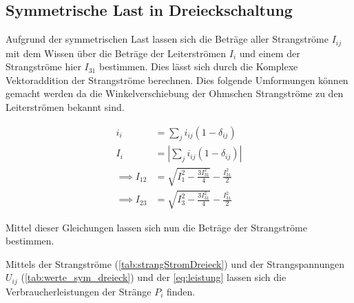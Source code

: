 \documentclass[12pt,english,ngerman]{scrartcl}
\begin{document}
\subsection{Symmetrische Last in Dreieckschaltung}\label{sec:ausw_dreieck}

Aufgrund der symmetrischen Last lassen sich die Beträge aller Strangströme
$I_{ij}$ mit dem Wissen über die Beträge der Leiterströmen $I_i$ und einem der
Strangströme hier $I_{31}$ bestimmen. Dies lässt sich durch die Komplexe
Vektoraddition der Strangströme berechnen. Dies folgende Umformungen können
gemacht werden da die Winkelverschiebung der Ohmschen Strangströme zu den
Leiterströmen bekannt sind.

\begin{align}
	i_{i}           & = \sum_{j} i_{ij} (1-\delta_{ij})                                                    \\
	I_{i}           & = |\sum_{j} i_{ij} (1-\delta_{ij})|                                                  \\
	\implies I_{12} & = \sqrt{I_1^2-\frac{3I_{31}^2}{4}}-\frac{I_{31}^2}{2}                                \\
	\implies I_{23} & = \sqrt{I_3^2-\frac{3I_{31}^2}{4}}-\frac{I_{31}^2}{2}\label{eq:complexstromaddition}
\end{align}

Mittel dieser Gleichungen lassen sich nun die Beträge der Strangströme
bestimmen.
\begin{table}[H]
	\caption[Errechnete Strangströme bei der Dreiecksschaltung]{ Errechnete Strangströme
		einer symmetrisch ohmsch-belasteten Dreiecksschaltung, siehe
		\autoref{fig:aufbau1}. Zur Berechnung wurde \autoref{eq:complexstromaddition}
		und die Daten aus \autoref{tab:werte_sym_dreieck} entnommen. \\
		$I_{ij} \dots$ errechnete Strangströme vom i-ten zum j-ten Leiter in \si{\ampere}.
	}\label{tab:strangStromDreieck}
	\centering
	
\end{table}

Mittels der Strangströme (\autoref{tab:strangStromDreieck}) und der
Strangspannungen $U_{ij}$ (\autoref{tab:werte_sym_dreieck}) und der
\autoref{eq:leistung} lassen sich die Verbraucherleistungen der Stränge $P_i$
finden.

\begin{table}[H]
	\caption[Errechnete Leistungen bei der Dreiecksschaltung]{ Errechnete Leistungen bei der
		Dreiecksschaltung                                      \\
		$P_i^C \dots$ errechnete Leistung am i-ten Strang in W \\
		$P_{ges}^C \dots$ errechnete Gesamtleistung in W       \\
		$P_{ges}^M \dots$ gemessene Gesamtleistung in W
	}\label{tab:powerDreieck}
	\centering
	
\end{table}
\end{document}

